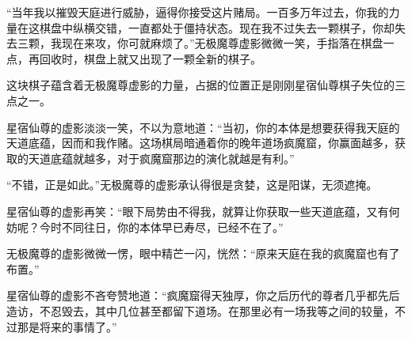 \begin{this_body}
“当年我以摧毁天庭进行威胁，逼得你接受这片赌局。一百多万年过去，你我的力量在这棋盘中纵横交错，一直都处于僵持状态。现在我不过失去一颗棋子，你却失去三颗，我现在来攻，你可就麻烦了。”无极魔尊虚影微微一笑，手指落在棋盘一点，再回收时，棋盘上就又出现了一颗全新的棋子。

这块棋子蕴含着无极魔尊虚影的力量，占据的位置正是刚刚星宿仙尊棋子失位的三点之一。

星宿仙尊的虚影淡淡一笑，不以为意地道：“当初，你的本体是想要获得我天庭的天道底蕴，因而和我作赌。这场棋局暗通着你的晚年道场疯魔窟，你赢面越多，获取的天道底蕴就越多，对于疯魔窟那边的演化就越是有利。”

“不错，正是如此。”无极魔尊的虚影承认得很是贪婪，这是阳谋，无须遮掩。

星宿仙尊的虚影再笑：“眼下局势由不得我，就算让你获取一些天道底蕴，又有何妨呢？今时不同往日，你的本体早已寿尽，已经不在了。”

无极魔尊的虚影微微一愣，眼中精芒一闪，恍然：“原来天庭在我的疯魔窟也有了布置。”

星宿仙尊的虚影不吝夸赞地道：“疯魔窟得天独厚，你之后历代的尊者几乎都先后造访，不忍毁去，其中几位甚至都留下道场。在那里必有一场我等之间的较量，不过那是将来的事情了。”

\end{this_body}

